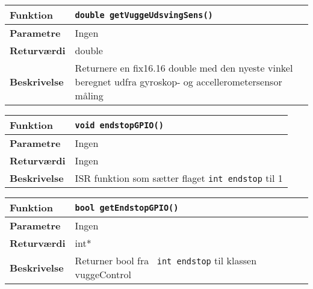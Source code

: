 \begin{center}
    \begin{tabular}{ | l | p{} |}
    \hline
    \textbf{Funktion}	& \verb+double getVuggeUdsvingSens() +				\\ \hline
    \textbf{Parametre} 	& Ingen							 		\\ \hline
    \textbf{Returværdi}	& double								\\ \hline
    \textbf{Beskrivelse}	& Returnere en fix16.16 double med den nyeste vinkel beregnet udfra gyroskop- og accellerometersensor måling	\\ \hline
    \end{tabular}
\end{center}




\begin{center}
    \begin{tabular}{ | l | p{} |}
    \hline
    \textbf{Funktion}	& \verb+void endstopGPIO() +				\\ \hline
    \textbf{Parametre} 	& Ingen							 		\\ \hline
    \textbf{Returværdi}	& Ingen						\\ \hline
    \textbf{Beskrivelse}	& ISR funktion som sætter flaget \verb+int endstop+ til 1	\\ \hline
    \end{tabular}
\end{center}

\begin{center}
    \begin{tabular}{ | l | p{} |}
    \hline
    \textbf{Funktion}	& \verb+bool getEndstopGPIO() +				\\ \hline
    \textbf{Parametre} 	& Ingen							 		\\ \hline
    \textbf{Returværdi}	& int*									\\ \hline
    \textbf{Beskrivelse}	& Returner bool fra \verb+ int endstop+ til klassen vuggeControl	\\ \hline
    \end{tabular}
\end{center}